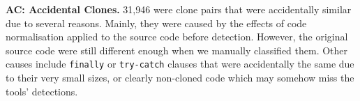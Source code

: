 \documentclass[sigconf,review, anonymous]{acmart}
\begin{document}
\textbf{AC: Accidental Clones.} 31,946 were clone pairs that were accidentally similar due to several reasons. Mainly, they were caused by the effects of code normalisation applied to the source code before detection. However, the original source code were still different enough when we manually classified them. Other causes include {\small{\texttt{finally}}} or {\small{\texttt{try-catch}}} clauses that were accidentally the same due to their very small sizes, or clearly non-cloned code which may somehow miss the tools' detections.


\end{document}
